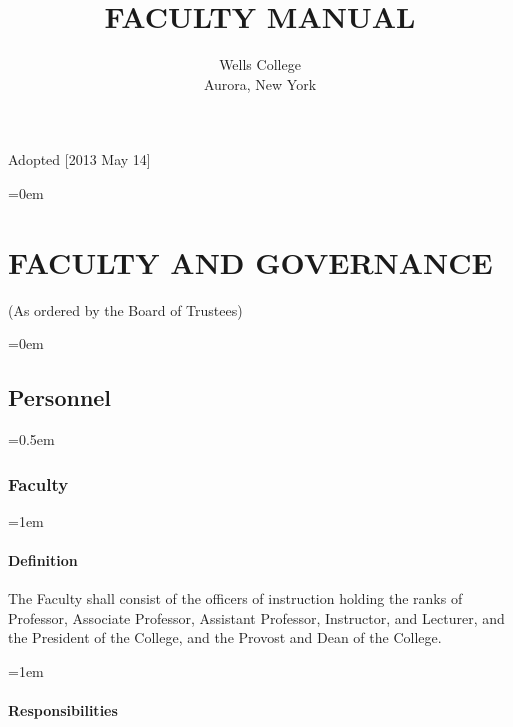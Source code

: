 \documentclass{manual}
\let\stdsection\section %
\renewcommand\section{\newpage\stdsection}
\let\oldsection\section
\renewcommand\section{\leftskip=0em\oldsection}
\let\oldsubsection\subsection
\renewcommand\subsection{\leftskip=0em\oldsubsection}
\let\oldsubsubsection\subsubsection
\renewcommand\subsubsection{\leftskip=0.5em\oldsubsubsection}
\let\oldparagraph\paragraph
\renewcommand\paragraph{\leftskip=1em\oldparagraph}
\begin{document}
\title{FACULTY MANUAL}

\author{Wells College\\Aurora, New York}

\maketitle
  \vfill
  \begin{center}
  Adopted [2013 May 14]
  \end{center}

\newpage
\pagestyle{fancy}
\fancyhead[R]{\thepage \addtocounter{articlePage}{1}}

\tableofcontents

\newpage
\fancyfoot[C]{\thesection-\thearticlePage}

\section{FACULTY AND GOVERNANCE}\label{art:FacultyAndGovernance}
		\begin{center}(As ordered by the Board of Trustees)\end{center}

	\subsection{Personnel}\label{sec:Personnel}

		\subsubsection{Faculty}\label{sub:Faculty}

			\paragraph{Definition}
			The Faculty shall consist of the officers of instruction holding the ranks of Professor, Associate Professor, Assistant Professor, Instructor, and Lecturer, and the President of the College, and the Provost and Dean of the College.

			\paragraph{Responsibilities}\label{sub:Responsibilities}
\end{document}
